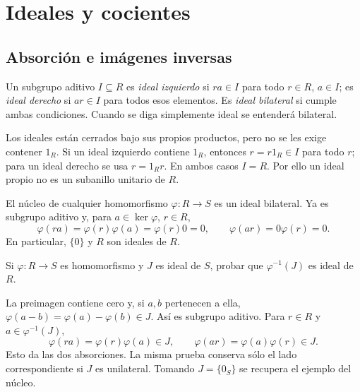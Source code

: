 \section{Ideales y cocientes}
\subsection{Absorción e imágenes inversas}
\begin{defi}
Un subgrupo aditivo $I\subseteq R$ es \emph{ideal izquierdo} si $ra\in I$ para todo $r\in R$, $a\in I$; es \emph{ideal derecho} si $ar\in I$ para todos esos elementos. Es \emph{ideal bilateral} si cumple ambas condiciones. Cuando se diga simplemente ideal se entenderá bilateral.
\end{defi}
Los ideales están cerrados bajo sus propios productos, pero no se les exige contener $1_R$. Si un ideal izquierdo contiene $1_R$, entonces $r=r1_R\in I$ para todo $r$; para un ideal derecho se usa $r=1_Rr$. En ambos casos $I=R$. Por ello un ideal propio no es un subanillo unitario de $R$.

\begin{ejem}
El núcleo de cualquier homomorfismo $\varphi:R\to S$ es un ideal bilateral. Ya es subgrupo aditivo y, para $a\in\ker\varphi$, $r\in R$,
\[
\varphi(ra)=\varphi(r)\varphi(a)=\varphi(r)0=0,
\qquad
\varphi(ar)=0\varphi(r)=0.
\]
En particular, $\{0\}$ y $R$ son ideales de $R$.
\end{ejem}

\begin{ejer}\label{ejer:C12-preimagen}
Si $\varphi:R\to S$ es homomorfismo y $J$ es ideal de $S$, probar que $\varphi^{-1}(J)$ es ideal de $R$.
\end{ejer}
\begin{sol}
La preimagen contiene cero y, si $a,b$ pertenecen a ella, $\varphi(a-b)=\varphi(a)-\varphi(b)\in J$. Así es subgrupo aditivo. Para $r\in R$ y $a\in\varphi^{-1}(J)$,
\[
\varphi(ra)=\varphi(r)\varphi(a)\in J,\qquad
\varphi(ar)=\varphi(a)\varphi(r)\in J.
\]
Esto da las dos absorciones. La misma prueba conserva sólo el lado correspondiente si $J$ es unilateral. Tomando $J=\{0_S\}$ se recupera el ejemplo del núcleo.
\end{sol}

